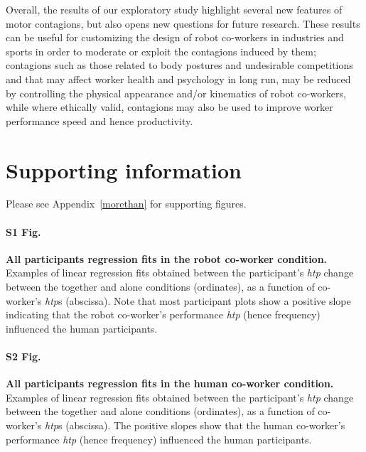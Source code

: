 \documentclass[a4paper, 12pt, oneside]{Thesis}  %
\begin{document}
Overall, the results of our exploratory study highlight several new features of motor contagions, but also opens new questions for future research. These results can be useful for customizing the design of robot co-workers in industries and sports in order to moderate or exploit the contagions induced by them; contagions such as those related to body postures and undesirable competitions and that may affect worker health and psychology in long run, may be reduced by controlling the physical appearance and/or kinematics of robot co-workers, while where ethically valid, contagions may also be used to improve worker performance speed and hence productivity.



\section*{Supporting information}


Please see Appendix~\ref{morethan} for supporting figures.

\paragraph*{S1 Fig.}
\label{S1_Fig}
{\bf All participants regression fits in the robot co-worker condition.} Examples of linear regression fits obtained between the participant's {\it htp} change between the together and alone conditions (ordinates), as a function of co-worker's {\it htp}s (abscissa).  Note that most participant plots show a positive slope indicating that the robot co-worker's performance {\it htp} (hence frequency) influenced the human participants.

\paragraph*{S2 Fig.}
\label{S2_Fig}
{\bf All participants regression fits in the human co-worker condition.} Examples of linear regression fits obtained between the participant's {\it htp} change between the together and alone conditions (ordinates), as a function of co-worker's {\it htp}s (abscissa). The positive slopes show that the human co-worker's performance {\it htp} (hence frequency) influenced the human participants.
\end{document}
